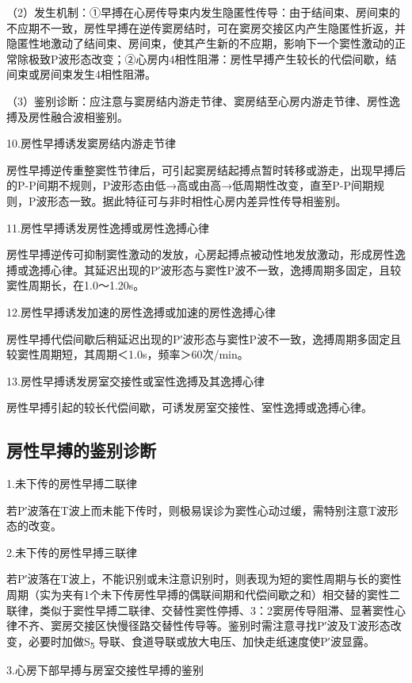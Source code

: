 （2）发生机制：①早搏在心房传导束内发生隐匿性传导：由于结间束、房间束的不应期不一致，房性早搏在逆传窦房结时，可在窦房交接区内产生隐匿性折返，并隐匿性地激动了结间束、房间束，使其产生新的不应期，影响下一个窦性激动的正常除极致P波形态改变；②心房内4相性阻滞：房性早搏产生较长的代偿间歇，结间束或房间束发生4相性阻滞。

（3）鉴别诊断：应注意与窦房结内游走节律、窦房结至心房内游走节律、房性逸搏及房性融合波相鉴别。

10.房性早搏诱发窦房结内游走节律

房性早搏逆传重整窦性节律后，可引起窦房结起搏点暂时转移或游走，出现早搏后的P-P间期不规则，P波形态由低→高或由高→低周期性改变，直至P-P间期规则，P波形态一致。据此特征可与非时相性心房内差异性传导相鉴别。

11.房性早搏诱发房性逸搏或房性逸搏心律

房性早搏逆传可抑制窦性激动的发放，心房起搏点被动性地发放激动，形成房性逸搏或逸搏心律。其延迟出现的P′波形态与窦性P波不一致，逸搏周期多固定，且较窦性周期长，在1.0～1.20s。

12.房性早搏诱发加速的房性逸搏或加速的房性逸搏心律

房性早搏代偿间歇后稍延迟出现的P′波形态与窦性P波不一致，逸搏周期多固定且较窦性周期短，其周期＜1.0s，频率＞60次/min。

13.房性早搏诱发房室交接性或室性逸搏及其逸搏心律

房性早搏引起的较长代偿间歇，可诱发房室交接性、室性逸搏或逸搏心律。

\protect\hypertarget{text00018.htmlux5cux23subid142}{}{}

\subsection{房性早搏的鉴别诊断}

1.未下传的房性早搏二联律

若P′波落在T波上而未能下传时，则极易误诊为窦性心动过缓，需特别注意T波形态的改变。

2.未下传的房性早搏三联律

若P′波落在T波上，不能识别或未注意识别时，则表现为短的窦性周期与长的窦性周期（实为夹有1个未下传房性早搏的偶联间期和代偿间歇之和）相交替的窦性二联律，类似于窦性早搏二联律、交替性窦性停搏、3：2窦房传导阻滞、显著窦性心律不齐、窦房交接区快慢径路交替性传导等。鉴别时需注意寻找P′波及T波形态改变，必要时加做S\textsubscript{5}
导联、食道导联或放大电压、加快走纸速度使P′波显露。

3.心房下部早搏与房室交接性早搏的鉴别

